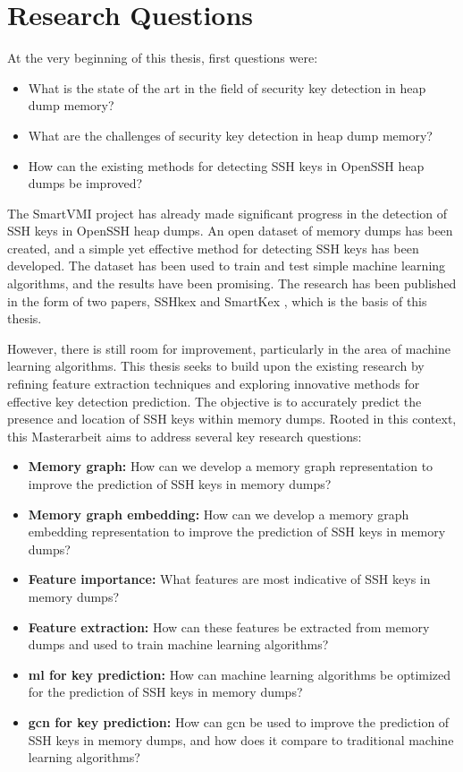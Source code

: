 \section{Research Questions}


At the very beginning of this thesis, first questions were:
\begin{itemize}
	\item What is the state of the art in the field of security key detection in heap dump memory?
	\item What are the challenges of security key detection in heap dump memory?
	\item How can the existing methods for detecting SSH keys in OpenSSH heap dumps be improved?
\end{itemize}

The SmartVMI project has already made significant progress in the detection of SSH keys in OpenSSH heap dumps. An open dataset of memory dumps has been created, and a simple yet effective method for detecting SSH keys has been developed. The dataset has been used to train and test simple machine learning algorithms, and the results have been promising. The research has been published in the form of two papers, SSHkex \cite{SSHkex22} and SmartKex \cite{SmartKex22}, which is the basis of this thesis. 

However, there is still room for improvement, particularly in the area of machine learning algorithms. This thesis seeks to build upon the existing research by refining feature extraction techniques and exploring innovative methods for effective key detection prediction. The objective is to accurately predict the presence and location of SSH keys within memory dumps. Rooted in this context, this Masterarbeit aims to address several key research questions:

\begin{itemize}
	\item \textbf{Memory graph:} How can we develop a memory graph representation to improve the prediction of SSH keys in memory dumps?
	\item \textbf{Memory graph embedding:} How can we develop a memory graph embedding representation to improve the prediction of SSH keys in memory dumps?
	\item \textbf{Feature importance:} What features are most indicative of SSH keys in memory dumps?
	\item \textbf{Feature extraction:} How can these features be extracted from memory dumps and used to train machine learning algorithms?
	\item \textbf{\acrshort{ml} for key prediction:} How can machine learning algorithms be optimized for the prediction of SSH keys in memory dumps? 
	\item \textbf{\acrlong{gcn} for key prediction:} How can \acrshort{gcn} be used to improve the prediction of SSH keys in memory dumps, and how does it compare to traditional machine learning algorithms?
\end{itemize}

